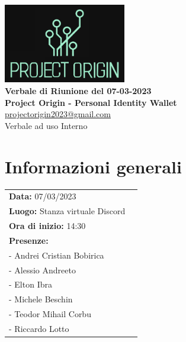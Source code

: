 \documentclass[a4paper,12pt]{article}
\begin{document}
\newcommand{\makefrontpage}{
	\begin{titlepage}
		\begin{center}
		\includegraphics[width=0.4\textwidth]{Project_Origin_full_logo.png}\\

		\vspace{1.5cm}
		{\LARGE \textbf{Verbale di Riunione del 07-03-2023}}
		\\\vspace{0.5cm}
		\textbf{Project Origin - Personal Identity Wallet}
		\\\vspace{0.2cm}		
		\href{mailto://projectorigin2023@gmail.com}{projectorigin2023@gmail.com}
		\\\vspace{0.5cm}
		\large{Verbale ad uso Interno}
		\vfill
		
		
		\vspace{2cm}

		
		\end{center}
	\end{titlepage}
}
\makefrontpage
\section*{Informazioni generali}
\begin{tabular}{ll}%
\textbf{Data:}  07/03/2023 \\
\textbf{Luogo:}  Stanza virtuale Discord \\
\textbf{Ora di inizio:}  14:30 \\
\textbf{Presenze:} \\
					\quad - Andrei Cristian Bobirica\\
					\quad - Alessio Andreeto\\
					\quad - Elton Ibra\\
					\quad - Michele Beschin\\
					\quad - Teodor Mihail Corbu\\
					\quad - Riccardo Lotto
\end{tabular}
\end{document}
